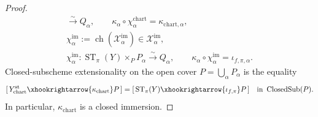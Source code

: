 \begin{proof}
\[\begin{gathered}
        \xrightarrow{\sim}Q_\alpha,
    \qquad
    \kappa_\alpha\circ\chi^{\mathrm{chart}}_\alpha
      =\kappa_{\mathrm{chart},\alpha},\\
    \chi^{\mathrm{im}}_\alpha
      :=\operatorname{ch}(\mathscr X^{\mathrm{im}}_\alpha)
      \in\mathscr X^{\mathrm{im}}_\alpha,\\
    \chi^{\mathrm{im}}_\alpha\colon
      \operatorname{ST}_\pi(Y)\times_PP_\alpha
        \xrightarrow{\sim}Q_\alpha,
    \qquad
    \kappa_\alpha\circ\chi^{\mathrm{im}}_\alpha
      =\iota_{f,\pi,\alpha}.
  \end{gathered}                                                  \tag{ST11}
  \]
  Closed-subscheme extensionality on the open cover
  $P=\bigcup_\alpha P_\alpha$ is the equality
  \[
    [\,Y^{\mathrm{st}}_{\mathrm{chart}}
        \xhookrightarrow{\kappa_{\mathrm{chart}}}P\,]
      =[\,\operatorname{ST}_\pi(Y)
        \xhookrightarrow{\iota_{f,\pi}}P\,]
      \quad\text{in }\operatorname{ClosedSub}(P).
  \]
  In particular, $\kappa_{\mathrm{chart}}$ is a closed immersion.
\end{proof}

